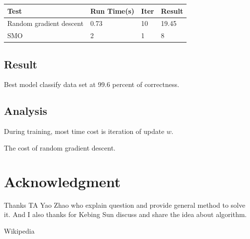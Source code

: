 \documentclass[conference,compsoc]{IEEEtran}
\begin{document}
\begin{center}
   \begin{tabular}{| l | l | l |l |}
   \hline
    Test                        &Run Time(s)  &Iter     &Result   \\ \hline
    Random gradient descent         & 0.73    &10     & 19.45  \\
	   SMO                             &2 &1      &8 \\
   \hline
   \end{tabular}
\end{center}

\subsection{Result}
Best model classify data set at 99.6 percent of correctness.

\subsection{Analysis}
During training, most time cost is iteration of update $w$.

The cost of random gradient descent.


\section*{Acknowledgment}
Thanks TA Yao Zhao who explain question and provide general method to solve it.
And I also thanks for Kebing Sun discuss and share the idea about algorithm.


\begin{thebibliography}{1}
Wikipedia
\end{thebibliography}

\end{document}
